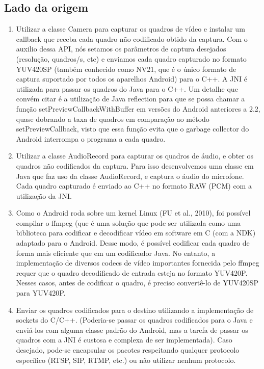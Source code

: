 \documentclass{acm_proc_article-sp}
\begin{document}
\subsection{Lado da origem}
\begin{enumerate}
 \item Utilizar a classe Camera para capturar os quadros de vídeo e instalar um callback que receba cada quadro não codificado obtido da captura. Com o auxilio dessa API, nós setamos os parâmetros de captura desejados (resolução, quadros/s, etc) e enviamos cada quadro capturado no formato YUV420SP (também conhecido como NV21, que é o único formato de captura suportado por todos os aparelhos Android) para o C++. A JNI é utilizada para passar os quadros do Java para o C++.
Um detalhe que convém citar é a utilização de Java reflection para que se possa chamar a função setPreviewCallbackWithBuffer em versões do Android anteriores a 2.2, quase dobrando a taxa de quadros em comparação ao método setPreviewCallback, visto que essa função evita que o garbage collector do Android interrompa o programa a cada quadro.
 \item Utilizar a classe AudioRecord para capturar os quadros de áudio, e obter os quadros não codificados da captura. Para isso desenvolvemos uma classe em Java que faz uso da classe AudioRecord, e captura o áudio do microfone. Cada quadro capturado é enviado ao C++ no formato RAW (PCM) com a utilização da JNI.
 \item Como o Android roda sobre um kernel Linux (FU et al., 2010), foi possível compilar o ffmpeg (que é uma solução que pode ser utilizada como uma biblioteca para codificar e decodificar vídeo em software \cite{ffmpeg} em C (com a NDK) adaptado para o Android. Desse modo, é possível codificar cada quadro de forma mais eficiente que em um codificador Java. No entanto, a implementação de diversos codecs de vídeo importantes fornecida pelo ffmpeg requer que o quadro decodificado de entrada esteja no formato YUV420P. Nesses casos, antes de codificar o quadro, é preciso convertê-lo de YUV420SP para YUV420P.
 \item Enviar os quadros codificados para o destino utilizando a implementação de sockets do C/C++. (Poderia-se passar os quadros codificados para o Java e enviá-los com alguma classe padrão do Android, mas a tarefa de passar os quadros com a JNI é custosa e complexa de ser implementada). Caso desejado, pode-se encapsular os pacotes respeitando qualquer protocolo específico (RTSP, SIP, RTMP, etc.) ou não utilizar nenhum protocolo.
\end{enumerate}
\end{document}
